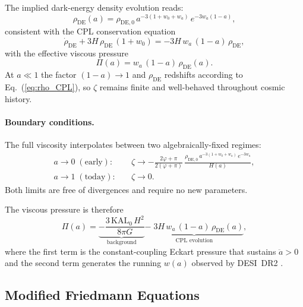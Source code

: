 The implied dark-energy density evolution reads:
%
\begin{equation}
  \rho_{\mathrm{DE}}(a)
    = \rho_{\mathrm{DE},0}\,
      a^{-3(1+w_0+w_a)}\,e^{-3w_a(1-a)},
  \label{eq:rho_CPL}
\end{equation}
%
consistent with the CPL conservation equation
%
\begin{equation}
  \dot\rho_{\mathrm{DE}}
    + 3H\,\rho_{\mathrm{DE}}\,(1+w_0)
    = -3H\,w_a\,(1-a)\,\rho_{\mathrm{DE}},
  \label{eq:cont_CPL}
\end{equation}
%
with the effective viscous pressure
%
\begin{equation}
  \Pi(a)
    = w_a\,(1-a)\,\rho_{\mathrm{DE}}(a).
  \label{eq:Pi_evolving}
\end{equation}
%
At $a \ll 1$ the factor $(1-a)\to 1$ and $\rho_{\mathrm{DE}}$ redshifts
according to Eq.~(\ref{eq:rho_CPL}), so $\zeta$ remains finite and
well-behaved throughout cosmic history.

\paragraph{Boundary conditions.}
The full viscosity interpolates between two algebraically-fixed regimes:
%
\begin{align}
  a \to 0 \;(\text{early}): &\quad
    \zeta \to -\frac{2\varphi+\pi}{2(\varphi+\pi)}\,
              \frac{\rho_{\mathrm{DE,0}}\,a^{-3(1+w_0+w_a)}\,e^{-3w_a}}{H(a)},
  \label{eq:zeta_early}\\[4pt]
  a \to 1 \;(\text{today}): &\quad
    \zeta \to 0.
  \label{eq:zeta_today}
\end{align}
%
Both limits are free of divergences and require no new parameters.

The viscous pressure is therefore
%
\begin{equation}
  \Pi(a)
    = \underbrace{-\frac{3\,\mathrm{KAL}_{0}\,H^{2}}{8\pi G}}_{\text{background}}
      \underbrace{-\;3H\,w_a\,(1-a)\,\rho_{\mathrm{DE}}(a)}_{\text{CPL evolution}},
  \label{eq:Pi_total}
\end{equation}
%
where the first term is the constant-coupling Eckart pressure that sustains
$\ddot a > 0$ and the second term generates the running $w(a)$ observed by
DESI~DR2 \citep{AbdulKarim2025}.

\subsection{Modified Friedmann Equations}
\label{sec:eft:friedmann}

